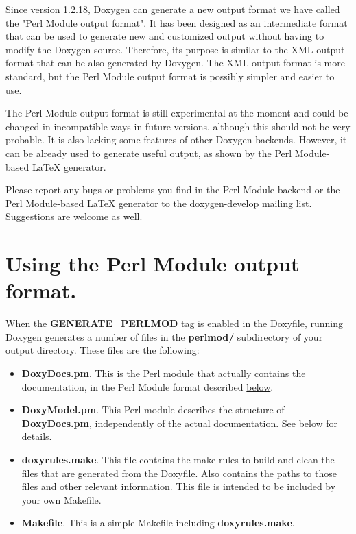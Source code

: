 
Since version 1.2.18, Doxygen can generate a new output format we have called the "Perl Module output format". It has been designed as an intermediate format that can be used to generate new and customized output without having to modify the Doxygen source. Therefore, its purpose is similar to the XML output format that can be also generated by Doxygen. The XML output format is more standard, but the Perl Module output format is possibly simpler and easier to use.

The Perl Module output format is still experimental at the moment and could be changed in incompatible ways in future versions, although this should not be very probable. It is also lacking some features of other Doxygen backends. However, it can be already used to generate useful output, as shown by the Perl Module-based LaTeX generator.

Please report any bugs or problems you find in the Perl Module backend or the Perl Module-based LaTeX generator to the doxygen-develop mailing list. Suggestions are welcome as well.\hypertarget{perlmod_using_perlmod_fmt}{}\section{Using the Perl Module output format.}\label{perlmod_using_perlmod_fmt}
When the {\bf GENERATE\_\-PERLMOD} tag is enabled in the Doxyfile, running Doxygen generates a number of files in the {\bf perlmod/} subdirectory of your output directory. These files are the following:

\begin{itemize}
\item {\bf DoxyDocs.pm}. This is the Perl module that actually contains the documentation, in the Perl Module format described \hyperlink{perlmod_doxydocs_format}{below}.

\item {\bf DoxyModel.pm}. This Perl module describes the structure of {\bf DoxyDocs.pm}, independently of the actual documentation. See \hyperlink{perlmod_doxymodel_format}{below} for details.

\item {\bf doxyrules.make}. This file contains the make rules to build and clean the files that are generated from the Doxyfile. Also contains the paths to those files and other relevant information. This file is intended to be included by your own Makefile.

\item {\bf Makefile}. This is a simple Makefile including {\bf doxyrules.make}.

\end{itemize}


